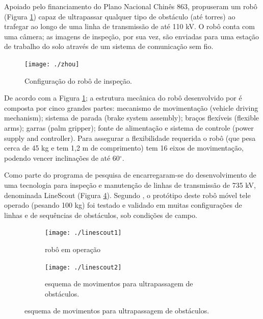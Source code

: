 Apoiado pelo financiamento do Plano Nacional Chinês 863,  propuseram um robô (Figura \ref{img:zhou}) capaz de ultrapassar qualquer tipo de obstáculo (até torres) ao trafegar ao longo de uma linha de transmissão de até 110 kV. O robô conta com uma câmera; as imagens de inspeção, por sua vez, são enviadas para uma estação de trabalho do solo através de um sistema de comunicação sem fio.  

\begin{figure} [h!]	
	\caption{Configuração do robô de inspeção.}
	\label{img:zhou}											 
	\centering													 
	\texttt{[image: ./zhou]}
\end{figure}													 

De acordo com a Figura \ref{img:zhou}; a estrutura mecânica do robô desenvolvido por  é composta por cinco grandes partes: mecanismo de movimentação (vehicle driving mechanism); sistema de parada (brake system assembly); braços flexíveis (flexible arms); garras (palm gripper); fonte de alimentação e sistema de controle (power supply and controller). Para assegurar a flexibilidade requerida o robô (que pesa cerca de 45 kg e tem 1,2 m de comprimento) tem 16 eixos de movimentação, podendo vencer inclinações de até 60$^{\circ}$. 

Como parte do programa de pesquisa de  encarregaram-se do desenvolvimento de uma tecnologia para inspeção e manutenção de linhas de transmissão de 735 kV, denominada LineScout (Figura \ref{fig:linescout}). Segundo , o protótipo deste robô móvel tele operado (pesando 100 kg) foi testado e validado em muitas configurações de linhas e de sequências de obstáculos, sob condições de campo.

\begin{figure}[h!]
		\caption{Robô LineScout.}
		\begin{subfigure}[b]{0.5\textwidth}
		  	\centering
		  	\texttt{[image: ./linescout1]} 
		  	\caption{robô em operação}
		  	\label{fig:linescout1}
		\end{subfigure} 
		\begin{subfigure}[b]{0.5\textwidth}
		  	\centering
		  	\texttt{[image: ./linescout2]} 
		  	\caption{esquema de movimentos para ultrapassagem de obstáculos.}
		  	\label{fig:linescout2}
		\end{subfigure} 
	  \label{fig:linescout}
\end{figure}

